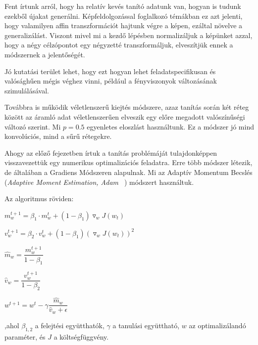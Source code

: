 

Fent írtunk arról, hogy ha relatív kevés tanító adatunk van, hogyan is tudunk
ezekből újakat generálni. Képfeldolgozással foglalkozó témákban ez azt jelenti,
hogy valamilyen affin transzformációt hajtunk végre a képen, ezáltal növelve a 
generalizálást. Viszont mivel mi a kezdő lépésben normalizáljuk a képünket azzal,
hogy a négy célzópontot egy négyzetté transzformáljuk, elveszítjük ennek a módszernek
a jelentőségét.


Jó kutatási terület lehet, hogy ezt hogyan lehet feladatspecifikusan és valósághűen 
mégis véghez vinni, például a fényviszonyok változásának szimulálásával.


Továbbra is működik véletlenszerű kiejtés módszere,
azaz tanítás során két réteg között az áramló adat véletlenszerűen elveszik
egy előre megadott valószínűségi változó szerint. Mi $ p=0.5 $ egyenletes 
eloszlást használtunk. Ez a módszer jó mind konvolúciós, mind a sűrű rétegekre.




Ahogy az előző fejezetben írtuk a tanítás problémáját tulajdonképpen visszavezettük
egy numerikus optimalizációs feladatra. Erre több módszer létezik, de általában a 
Gradiens Módszeren alapulnak. Mi az Adaptív Momentum Becslés 
(\textit{Adaptive Moment Estimation, Adam~\cite{adam} }) módszert használtuk.

\noindent
Az algoritmus röviden:

$ m_w^{t+1} = \beta_1 \cdot m_w^{t} + (1-\beta_1) \triangledown_w J(w_t) $

$ v_w^{t+1} = \beta_2 \cdot v_w^{t} + (1-\beta_1) (\triangledown_w J(w_t))^2 $

$ \hat{m}_w = \dfrac{m_w^{t+1}}{1 - \beta_1} $

$ \hat{v}_w = \dfrac{v_w^{t+1}}{1 - \beta_2} $

$ w^{t+1} = w^{t} - \gamma \dfrac{\hat{m}_w}{\hat{v}_w + \epsilon}   $

\noindent
,ahol $ \beta_{1,2} $ a felejtési együtthatók, $ \gamma $ a tanulási együttható,
$ w $ az optimalizálandó paraméter, és $ J $ a költségfüggvény.

